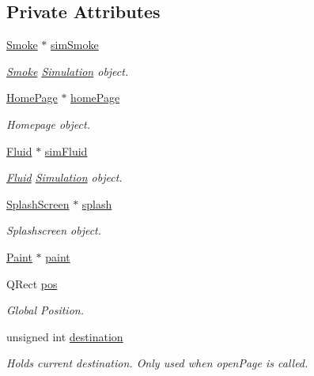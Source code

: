 \subsection*{Private Attributes}
\begin{DoxyCompactItemize}
\item 
\mbox{\hyperlink{classSmoke}{Smoke}} $\ast$ \mbox{\hyperlink{classStack_a0eb428edacee758da17e9b8a8943db79}{sim\+Smoke}}
\begin{DoxyCompactList}\small\item\em \mbox{\hyperlink{classSmoke}{Smoke}} \mbox{\hyperlink{classSimulation}{Simulation}} object. \end{DoxyCompactList}\item 
\mbox{\hyperlink{classHomePage}{Home\+Page}} $\ast$ \mbox{\hyperlink{classStack_aa1bb5aa087f1766cec2dab2174159194}{home\+Page}}
\begin{DoxyCompactList}\small\item\em Homepage object. \end{DoxyCompactList}\item 
\mbox{\hyperlink{classFluid}{Fluid}} $\ast$ \mbox{\hyperlink{classStack_a528378e89155254d8245e44892e93bd7}{sim\+Fluid}}
\begin{DoxyCompactList}\small\item\em \mbox{\hyperlink{classFluid}{Fluid}} \mbox{\hyperlink{classSimulation}{Simulation}} object. \end{DoxyCompactList}\item 
\mbox{\hyperlink{classSplashScreen}{Splash\+Screen}} $\ast$ \mbox{\hyperlink{classStack_a2d3f7bf6df4a15c81ed677fd728dda4c}{splash}}
\begin{DoxyCompactList}\small\item\em Splashscreen object. \end{DoxyCompactList}\item 
\mbox{\hyperlink{classPaint}{Paint}} $\ast$ \mbox{\hyperlink{classStack_ae20446c30ae36243a42983dcdc371258}{paint}}
\item 
Q\+Rect \mbox{\hyperlink{classStack_a89c03088e1dd8cf4eb333638b059d30a}{pos}}
\begin{DoxyCompactList}\small\item\em Global Position. \end{DoxyCompactList}\item 
unsigned int \mbox{\hyperlink{classStack_a1ef23f9e493b0f9d535eb8282114444d}{destination}}
\begin{DoxyCompactList}\small\item\em Holds current destination. Only used when open\+Page is called. \end{DoxyCompactList}\item 

\end{DoxyCompactItemize}
